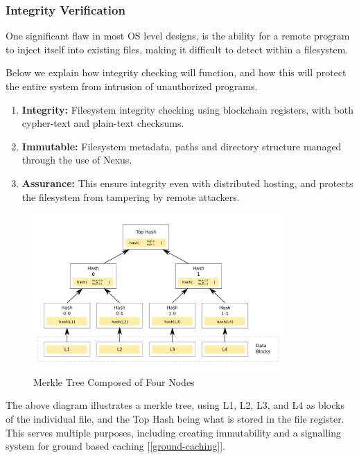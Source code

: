 \documentclass[11pt]{article}
\begin{document}
\subsubsection{Integrity Verification}

\noindent One significant flaw in most OS level designs, is the ability for a remote program to inject itself into existing files, making it difficult to detect within a filesystem.

\pagebreak
\noindent Below we explain how integrity checking will function, and how this will protect the entire system from intrusion of unauthorized programs.

\begin{enumerate}
    \item \textbf{Integrity:} Filesystem integrity checking using blockchain registers, with both cypher-text and plain-text checksums.
    \item \textbf{Immutable:} Filesystem metadata, paths and directory structure managed through the use of Nexus.
    \item \textbf{Assurance:} This ensure integrity even with distributed hosting, and protects the filesystem from tampering by remote attackers.
\end{enumerate}

\begin{figure}[h]
    \centering
    \includegraphics[width=0.85\textwidth]{./images/rsz_merkle.png}
    \caption{Merkle Tree Composed of Four Nodes \cite{merkle-tree}}
\end{figure}

\noindent The above diagram illustrates a merkle tree, using L1, L2, L3, and L4 as blocks of the individual file, and the Top Hash being what is stored in the file register.
This serves multiple purposes, including creating immutability and a signalling system for ground based caching [\ref{ground-caching}].
\end{document}
